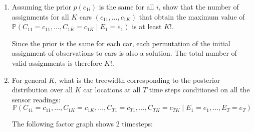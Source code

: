 \documentclass[10pt]{article}
\begin{document}
\begin{enumerate}[label=(\alph*)]
  \item Assuming the prior $p(c_{1i})$ is the same for all $i$, show that the number of assignments for all $K$ cars $(c_{11}, \dots, c_{1K})$ that obtain the maximum value of $\mathbb{P}(C_{11} = c_{11}, \dots, C_{1K} = c_{1K} \mid E_1 = e_1)$ is at least $K!$.
  
	Since the prior is the same for each car, each permutation of the initial assignment of observations to cars is also a solution. The total number of valid assignments is therefore $K!$.  
  
  \item For general $K$, what is the treewidth corresponding to the posterior distribution over all $K$ car locations at all $T$ time steps conditioned on all the sensor readings:
  $$\mathbb{P}(C_{11} = c_{11}, \dots, C_{1K} = c_{1K} , \dots, C_{T1} = c_{T1}, \dots, C_{TK} = c_{TK} \mid E_1 = e_1, \dots, E_T = e_T)$$

	The following factor graph shows 2 timesteps:
	

\end{enumerate}
\end{document}
